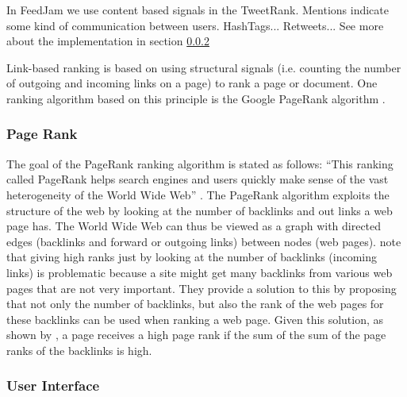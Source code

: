 In FeedJam we use content based signals in the TweetRank. Mentions indicate some kind of communication between users. %
HashTags...
Retweets...
 See more about the implementation in section \ref{} \nameref{}

Link-based ranking is based on using structural signals (i.e. counting the number of outgoing and incoming links on a page) to rank a page or document. One ranking algorithm based on this  principle is the Google PageRank algorithm \citep{Page1999}.

\subsubsection{Page Rank}
The goal of the PageRank ranking algorithm is stated as follows: “This ranking called PageRank helps search engines and users quickly make sense of the vast heterogeneity of the World Wide Web” \citep[p. 1]{Page1999}. The PageRank algorithm exploits the structure of the web by looking at the number of backlinks and out links a web page has. The World Wide Web can thus be viewed as a graph with directed edges (backlinks and forward or outgoing links) between nodes (web pages). \citet{Page1999} note that giving high ranks just by looking at the number of backlinks (incoming links) is problematic because a site might get many backlinks from various web pages that are not very important. They provide a solution to this by proposing that not only the number of backlinks, but also the rank of the web pages for these backlinks can be used when ranking a web page. Given this solution, as shown by \citet{Page1999}, a page receives a high page rank if the sum of the sum of the page ranks of the backlinks is high.


\subsubsection{User Interface}

